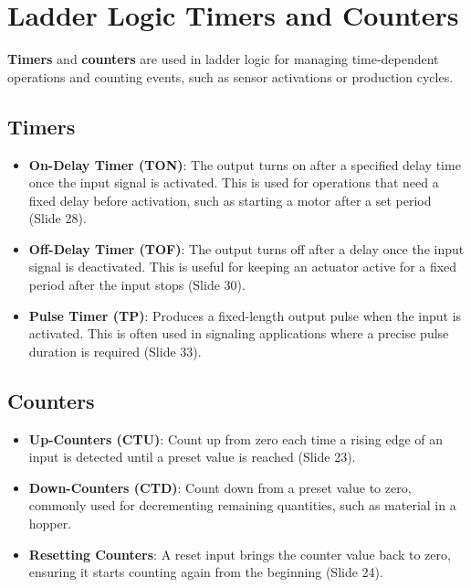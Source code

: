 \documentclass[
  14pt,
  a4paper,
  numbers=noendperiod,
  headinclude=true,
  footinclude=true,
  DIV=calc]{scrreprt}
\providecommand{\tightlist}{%
  \setlength{\itemsep}{0pt}\setlength{\parskip}{0pt}}\usepackage{longtable,booktabs,array}
\begin{document}
\section{Ladder Logic Timers and
Counters}\label{ladder-logic-timers-and-counters}

\textbf{Timers} and \textbf{counters} are used in ladder logic for
managing time-dependent operations and counting events, such as sensor
activations or production cycles.

\subsection{Timers}\label{timers}

\begin{itemize}
\tightlist
\item
  \textbf{On-Delay Timer (TON)}: The output turns on after a specified
  delay time once the input signal is activated. This is used for
  operations that need a fixed delay before activation, such as starting
  a motor after a set period (Slide 28).
\item
  \textbf{Off-Delay Timer (TOF)}: The output turns off after a delay
  once the input signal is deactivated. This is useful for keeping an
  actuator active for a fixed period after the input stops (Slide 30).
\item
  \textbf{Pulse Timer (TP)}: Produces a fixed-length output pulse when
  the input is activated. This is often used in signaling applications
  where a precise pulse duration is required (Slide 33).
\end{itemize}

\subsection{Counters}\label{counters}

\begin{itemize}
\tightlist
\item
  \textbf{Up-Counters (CTU)}: Count up from zero each time a rising edge
  of an input is detected until a preset value is reached (Slide 23).
\item
  \textbf{Down-Counters (CTD)}: Count down from a preset value to zero,
  commonly used for decrementing remaining quantities, such as material
  in a hopper.
\item
  \textbf{Resetting Counters}: A reset input brings the counter value
  back to zero, ensuring it starts counting again from the beginning
  (Slide 24).
\end{itemize}
\end{document}
